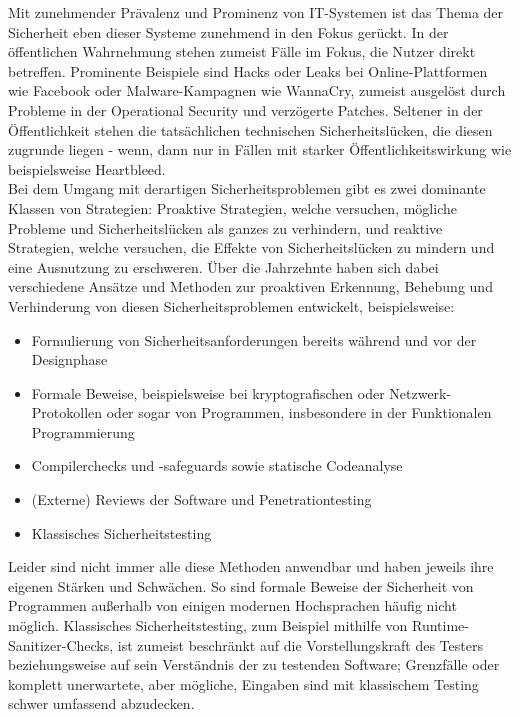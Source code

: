 \documentclass[a4paper]{article}
\begin{document}
Mit zunehmender Prävalenz und Prominenz von IT-Systemen ist das Thema der Sicherheit eben dieser Systeme zunehmend in den Fokus gerückt. 
In der öffentlichen Wahrnehmung stehen zumeist Fälle im Fokus, die Nutzer direkt betreffen. 
Prominente Beispiele sind Hacks oder Leaks bei Online-Plattformen wie Facebook\cite{facebook} oder Malware-Kampagnen wie WannaCry\cite{ransomware}, zumeist ausgelöst durch Probleme in der Operational Security und verzögerte Patches.
Seltener in der Öffentlichkeit stehen die tatsächlichen technischen Sicherheitslücken, die diesen zugrunde liegen - wenn, dann nur in Fällen mit starker Öffentlichkeitswirkung wie beispielsweise Heartbleed\cite{heartbleed}.\\
Bei dem Umgang mit derartigen Sicherheitsproblemen gibt es zwei dominante Klassen von Strategien: Proaktive Strategien, welche versuchen, mögliche Probleme und Sicherheitslücken als ganzes zu verhindern, und reaktive Strategien, welche versuchen, die Effekte von Sicherheitslücken zu mindern und eine Ausnutzung zu erschweren.
Über die Jahrzehnte haben sich dabei verschiedene Ansätze und Methoden zur proaktiven Erkennung, Behebung und Verhinderung von diesen Sicherheitsproblemen entwickelt, beispielsweise\cite{securitymethods}:
\begin{itemize}
\item Formulierung von Sicherheitsanforderungen bereits während und vor der Designphase
\item Formale Beweise, beispielsweise bei kryptografischen oder Netzwerk-Proto\-kollen oder sogar von Programmen, insbesondere in der Funktionalen Programmierung
\item Compilerchecks und -safeguards sowie statische Codeanalyse
\item (Externe) Reviews der Software und Penetrationtesting
\item Klassisches Sicherheitstesting
\end{itemize}
Leider sind nicht immer alle diese Methoden anwendbar und haben jeweils ihre eigenen Stärken und Schwächen. So sind formale Beweise der Sicherheit von Programmen außerhalb von einigen modernen Hochsprachen häufig nicht möglich. Klassisches Sicherheitstesting, zum Beispiel mithilfe von Runtime-Sanitizer-Checks, ist zumeist beschränkt auf die Vorstellungskraft des Testers beziehungsweise auf sein Verständnis der zu testenden Software; Grenzfälle oder komplett unerwartete, aber mögliche, Eingaben sind mit klassischem Testing schwer umfassend abzudecken.\\
\end{document}
